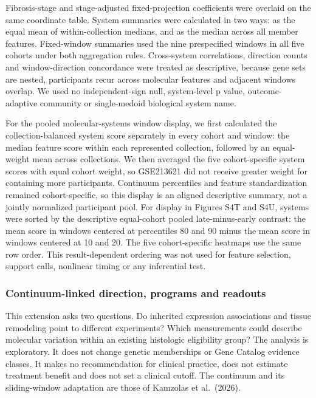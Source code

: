 Fibrosis-stage and stage-adjusted fixed-projection coefficients were overlaid on the same coordinate table. System summaries were calculated in two ways: as the equal mean of within-collection medians, and as the median across all member features. Fixed-window summaries used the nine prespecified windows in all five cohorts under both aggregation rules. Cross-system correlations, direction counts and window-direction concordance were treated as descriptive, because gene sets are nested, participants recur across molecular features and adjacent windows overlap. We used no independent-sign null, system-level p value, outcome-adaptive community or single-medoid biological system name.

For the pooled molecular-systems window display, we first calculated the collection-balanced system score separately in every cohort and window: the median feature score within each represented collection, followed by an equal-weight mean across collections. We then averaged the five cohort-specific system scores with equal cohort weight, so GSE213621 did not receive greater weight for containing more participants. Continuum percentiles and feature standardization remained cohort-specific, so this display is an aligned descriptive summary, not a jointly normalized participant pool. For display in Figures S4T and S4U, systems were sorted by the descriptive equal-cohort pooled late-minus-early contrast: the mean score in windows centered at percentiles 80 and 90 minus the mean score in windows centered at 10 and 20. The five cohort-specific heatmaps use the same row order. This result-dependent ordering was not used for feature selection, support calls, nonlinear timing or any inferential test.

\subsubsection{Continuum-linked direction, programs and readouts}\label{continuum-linked-direction-programs-and-readouts}

This extension asks two questions. Do inherited expression associations and tissue remodeling point to different experiments? Which measurements could describe molecular variation within an existing histologic eligibility group? The analysis is exploratory. It does not change genetic memberships or Gene Catalog evidence classes. It makes no recommendation for clinical practice, does not estimate treatment benefit and does not set a clinical cutoff. The continuum and its sliding-window adaptation are those of Kamzolas et al.~(2026).

